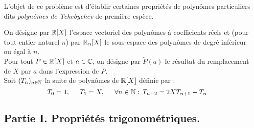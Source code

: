 L'objet de ce problème est d'établir certaines propriétés de polynômes particuliers dits \emph{polynômes de Tchebychev} de première espèce.


On désigne par $\mathbb{R}[X]$ l'espace vectoriel des polynômes à coefficients réels et (pour tout entier naturel $n$) par $\mathbb{R}_n[X]$ le sous-espace  des polynômes de degré inférieur ou égal à $n$.\\
Pour tout $P\in\mathbb{R}[X]$ et $a\in\mathbb{C}$, on désigne par $\widetilde{P}(a)$ le résultat du remplacement de $X$ par $a$ dans l'expression de $P$.\\
Soit $(T_n)_{n\in\mathbb{N}}$  la suite de polynômes de $\mathbb{R}[X]$ définie par :
\begin{displaymath}
 T_0 = 1,\hspace{0.5cm}
 T_1 = X,\hspace{0.5cm}
 \forall n\in \mathbb{N} :\,  T_{n+2} = 2XT_{n+1}-T_{n}
\end{displaymath}

\subsection*{Partie I. Propriétés trigonométriques.}

